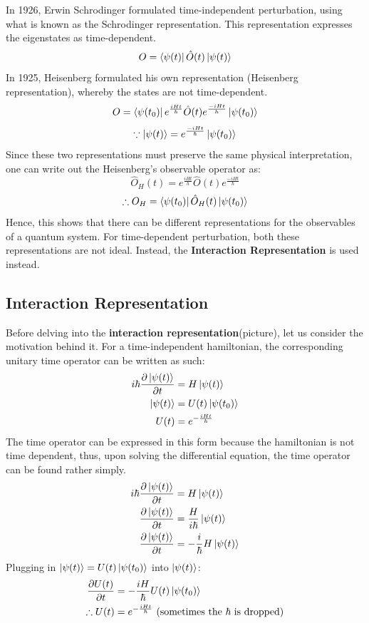 \documentclass{article}
\begin{document}
\begin{flushleft}
In 1926, Erwin Schrodinger formulated time-independent perturbation, using what is known as the Schrodinger representation. This representation expresses the eigenstates as time-dependent. 
$$O=\bra{\psi(t)}\hat{O}(t)\ket{\psi(t)}$$
In 1925, Heisenberg formulated his own representation (Heisenberg representation), whereby the states are not time-dependent.
$$O=\bra{\psi(t_0)}e^{\frac{iHt}{h}}\hat{O}(t)e^{\frac{-iHt}{h}}\ket{\psi(t_0)}$$
$$\because \ket{\psi(t)}=e^{\frac{-iHt}{\hbar}}\ket{\psi(t_0)}$$
Since these two representations must preserve the same physical interpretation, one can write out the Heisenberg's observable operator as:
$$\hat{O}_H(t)=e^{\frac{iHt}{h}}\hat{O}(t)e^{\frac{-iHt}{\hbar}}$$
$$\therefore O_H=\bra{\psi(t_0)}\hat{O}_H(t)\ket{\psi(t_0)}$$
Hence, this shows that there can be different representations for the observables of a quantum system. For time-dependent perturbation, both these representations are not ideal. Instead, the \textbf{Interaction Representation} is used instead.

\subsection{Interaction Representation}
Before delving into the \textbf{interaction representation}(picture), let us consider the motivation behind it. For a time-independent hamiltonian, the corresponding unitary time operator can be written as such:
\begin{align*}
    i\hbar\frac{\partial\ket{\psi(t)}}{\partial t}&=H\ket{\psi(t)}\\
    \ket{\psi(t)}&=U(t)\ket{\psi(t_0)}\\
    U(t)&=e^{-\frac{iHt}{h}}
    \end{align*}
The time operator can be expressed in this form because the hamiltonian is not time dependent, thus, upon solving the differential equation, the time operator can be found rather simply.
\begin{align*}
    i\hbar\frac{\partial\ket{\psi(t)}}{\partial t}&=H\ket{\psi(t)}\\    
    \frac{\partial\ket{\psi(t)}}{\partial t}&=\frac{H}{ i\hbar}\ket{\psi(t)}\\
    \frac{\partial\ket{\psi(t)}}{\partial t}&=-\frac{i}{\hbar}H\ket{\psi(t)}\\
    \end{align*}
Plugging in $\ket{\psi(t)}=U(t)\ket{\psi(t_0)}$ into $\ket{\psi(t)}$:
\begin{align*}
    \frac{\partial U(t)}{\partial t}&=-\frac{iH}{\hbar}U(t)\ket{\psi(t_0)}\\
    \therefore U(t)&=e^{-\frac{iHt}{\hbar}}\ (\text{sometimes the}\ \hbar\ \text{is dropped})
\end{align*}
    


\end{flushleft}
\end{document}
